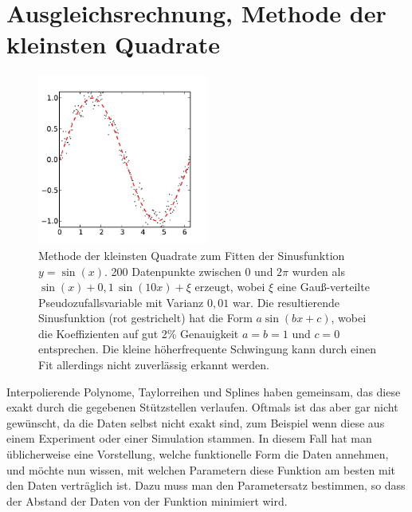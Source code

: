 \section{Ausgleichsrechnung, Methode der kleinsten Quadrate}

\begin{figure}
  \centering
  \includegraphics[width=0.5\textwidth]{plots/leastsq}
  \caption{Methode der kleinsten Quadrate zum Fitten der Sinusfunktion
    $y=\sin(x)$. 200 Datenpunkte zwischen 0 und $2\pi$ wurden als
    $\sin(x) + 0,1\,\sin(10 x) + \xi$ erzeugt, wobei $\xi$ eine
    Gauß-verteilte Pseudozufallsvariable mit Varianz $0,01$ war. Die
    resultierende Sinusfunktion (rot gestrichelt) hat die Form $a
    \sin(bx+c)$, wobei die Koeffizienten auf gut 2\% Genauigkeit
    $a=b=1$ und $c=0$ entsprechen. Die kleine höherfrequente
    Schwingung kann durch einen Fit allerdings nicht zuverlässig
    erkannt werden.}
  \label{fig:leastsq}
\end{figure}

Interpolierende Polynome, Taylorreihen und Splines haben gemeinsam,
das diese exakt durch die gegebenen Stützstellen verlaufen. Oftmals
ist das aber gar nicht gewünscht, da die Daten selbst nicht exakt
sind, zum Beispiel wenn diese aus einem Experiment oder einer
Simulation stammen. In diesem Fall hat man üblicherweise eine
Vorstellung, welche funktionelle Form die Daten annehmen, und möchte
nun wissen, mit welchen Parametern diese Funktion am besten mit den
Daten verträglich ist. Dazu muss man den Parametersatz bestimmen, so
dass der Abstand der Daten von der Funktion minimiert wird.

